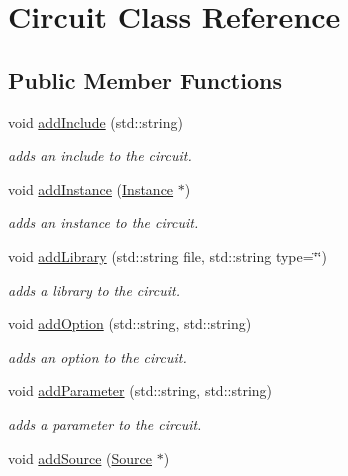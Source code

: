 \hypertarget{class_s_p_i_c_e_1_1_circuit}{}\section{Circuit Class Reference}
\label{class_s_p_i_c_e_1_1_circuit}
\subsection*{Public Member Functions}
\begin{DoxyCompactItemize}
\item 
void \hyperlink{class_s_p_i_c_e_1_1_circuit_a30fc53c4da54215fdec3ab1b96ea1943}{add\+Include} (std\+::string)
\begin{DoxyCompactList}\small\item\em adds an include to the circuit. \end{DoxyCompactList}\item 
void \hyperlink{class_s_p_i_c_e_1_1_circuit_a7bb4a4532643568ab1ac2c229185a88e}{add\+Instance} (\hyperlink{class_s_p_i_c_e_1_1_instance}{Instance} $\ast$)
\begin{DoxyCompactList}\small\item\em adds an instance to the circuit. \end{DoxyCompactList}\item 
void \hyperlink{class_s_p_i_c_e_1_1_circuit_a49939060cc1cb8e4bfaf003025032096}{add\+Library} (std\+::string file, std\+::string type=\char`\"{}\char`\"{})
\begin{DoxyCompactList}\small\item\em adds a library to the circuit. \end{DoxyCompactList}\item 
void \hyperlink{class_s_p_i_c_e_1_1_circuit_a1abe34b48e2b6e1834a143fdef159cb9}{add\+Option} (std\+::string, std\+::string)
\begin{DoxyCompactList}\small\item\em adds an option to the circuit. \end{DoxyCompactList}\item 
void \hyperlink{class_s_p_i_c_e_1_1_circuit_ab3ab147a16bc490ce96db905a4ca271c}{add\+Parameter} (std\+::string, std\+::string)
\begin{DoxyCompactList}\small\item\em adds a parameter to the circuit. \end{DoxyCompactList}\item 
void \hyperlink{class_s_p_i_c_e_1_1_circuit_a627cf18c2763bb59f3d7e5142873251c}{add\+Source} (\hyperlink{class_s_p_i_c_e_1_1_source}{Source} $\ast$)

\end{DoxyCompactItemize}
